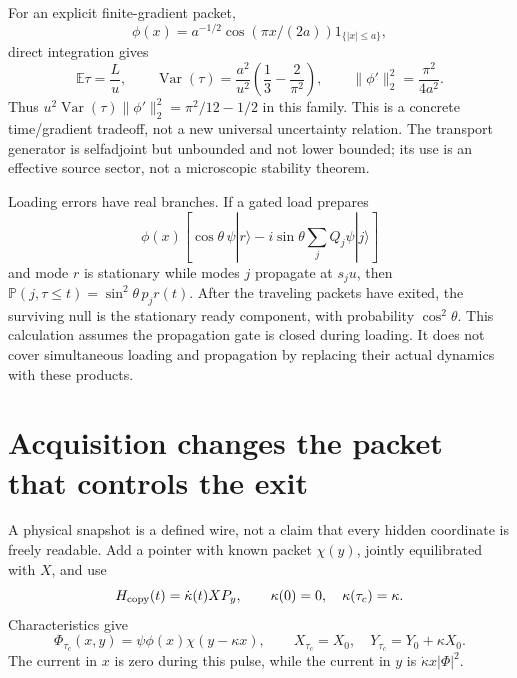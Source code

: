 \documentclass[11pt,oneside,openany]{book}
\theoremstyle{definition}
\theoremstyle{remark}\newtheorem{remark}[theorem]{Remark}
\begin{document}
For an explicit finite-gradient packet,
\[
 \phi(x)=a^{-1/2}\cos(\pi x/(2a))1_{\{|x|\le a\}},
\]
direct integration gives
\begin{equation}
 \mathbb E\tau=\frac Lu,\qquad
 \operatorname{Var}(\tau)=\frac{a^2}{u^2}
          \left(\frac13-\frac2{\pi^2}\right),\qquad
 \|\phi'\|_2^2=\frac{\pi^2}{4a^2}.
 \label{cfg:timecost}
\end{equation}
Thus $u^2\operatorname{Var}(\tau)\|\phi'\|_2^2=\pi^2/12-1/2$ in this
family. This is a concrete time/gradient tradeoff, not a new universal
uncertainty relation. The transport generator is selfadjoint but unbounded
and not lower bounded; its use is an effective source sector, not a
microscopic stability theorem.

Loading errors have real branches. If a gated load prepares
\[
 \phi(x)\left[\cos\theta\,\psi|r\rangle
       -i\sin\theta\sum_jQ_j\psi|j\rangle\right]
\]
and mode $r$ is stationary while modes $j$ propagate at $s_ju$, then
$\mathbb P(j,\tau\le t)=\sin^2\theta\,p_jr(t)$.
After the traveling packets have exited, the surviving null is the stationary
ready component, with probability $\cos^2\theta$. This calculation assumes
the propagation gate is closed during loading. It does not cover simultaneous
loading and propagation by replacing their actual dynamics with these
products.

\section{Acquisition changes the packet that controls the exit}

A physical snapshot is a defined wire, not a claim that every hidden
coordinate is freely readable. Add a pointer with known packet $\chi(y)$,
jointly equilibrated with $X$, and use
\[
 H_{\rm copy}(t)=\dot\kappa(t)X P_y,\qquad
 \kappa(0)=0,\quad\kappa(\tau_c)=\kappa.
\]
Characteristics give
\begin{equation}
 \Phi_{\tau_c}(x,y)=\psi\phi(x)\chi(y-\kappa x),\qquad
 X_{\tau_c}=X_0,\quad Y_{\tau_c}=Y_0+\kappa X_0.
 \label{cfg:snapshot}
\end{equation}
The current in $x$ is zero during this pulse, while the current in $y$
is $\dot\kappa x|\Phi|^2$.
\end{document}
